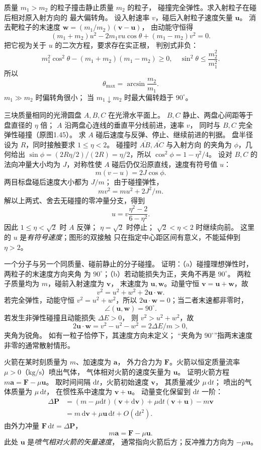 质量 $m_1>m_2$ 的粒子撞击静止质量 $m_2$ 的粒子，
碰撞完全弹性。求入射粒子在碰后相对原入射方向的
最大偏转角。
\exsolution
设入射速率 $v$，碰后入射粒子速度矢量 $\bm u$。
消去靶粒子的末速度
$\bm w=(m_1/m_2)(\bm v-\bm u)$，
由动能守恒得
\[
(m_1+m_2)u^2-2m_1vu\cos\theta+(m_1-m_2)v^2=0.
\]
把它视为关于 $u$ 的二次方程，要求存在实正根，
判别式非负：
\[
m_1^2\cos^2\theta-(m_1+m_2)(m_1-m_2)\ge0,
\quad \sin^2\theta\le\frac{m_2^2}{m_1^2}.
\]
所以
\[
\boxed{\theta_{\max}=\arcsin\frac{m_2}{m_1}}.
\]
\excheck $m_1\gg m_2$ 时偏转角很小；
当 $m_1\downarrow m_2$ 时最大偏转趋于 $90^\circ$。

三块质量相同的光滑圆盘 $A,B,C$ 在光滑水平面上。
$B,C$ 静止、两盘心间距等于盘直径的 $\eta$ 倍；
$A$ 沿两盘心连线的垂直平分线前进，速率 $v$，
同时与 $B,C$ 完全弹性碰撞（原图1.45）。
求 $A$ 碰后速度与反弹、停止、继续前进的判据。
\exsolution
盘半径设为 $R$，同时接触要求 $1\le\eta<2$。
碰撞时 $\overline{AB},\overline{AC}$ 与入射方向
的夹角为 $\phi$，几何给出
$\sin\phi=(2R\eta/2)/(2R)=\eta/2$，所以
$\cos^2\phi=1-\eta^2/4$。
设对 $B,C$ 的法向冲量大小均为 $J$，对称性使
$A$ 碰后仍仅沿原直线，速度有符号值 $u$：
\[
m(v-u)=2J\cos\phi.
\]
两目标盘碰后速度大小都为 $J/m$；
由于碰撞弹性，
\[
mv^2=mu^2+2J^2/m.
\]
解以上两式、舍去无碰撞的零冲量分支，得到
\[
\boxed{u=v\frac{\eta^2-2}{6-\eta^2}}.
\]
因此 $1\le\eta<\sqrt2$ 时 $A$ 反弹；
$\eta=\sqrt2$ 时停止；
$\sqrt2<\eta<2$ 时继续向前。
\excheck 这里的 $u$ 是\emph{有符号速度}；图形的双接触
只在指定中心距区间有意义，不能延伸到 $\eta>2$。

一个分子与另一个同质量、碰前静止的分子碰撞。
证明：（a）碰撞理想弹性时，两粒子的末速度方向夹角
为 $90^\circ$；（b）若动能损失为正，夹角不再是 $90^\circ$。
\exsolution
两粒子质量均为 $m$，碰前入射速度为 $\bm v$，
末速度为 $\bm u,\bm w$。动量守恒
$\bm v=\bm u+\bm w$，故
\[
v^2=u^2+w^2+2\bm u\cdot\bm w.
\]
若完全弹性，动能守恒
$v^2=u^2+w^2$，所以
$2\bm u\cdot\bm w=0$；当二者末速都非零时，
\[
\boxed{\angle(\bm u,\bm w)=90^\circ}.
\]
若发生非弹性碰撞且动能损失 $\Delta E>0$，
则 $v^2>u^2+w^2$，故
\[
2\bm u\cdot\bm w
=v^2-u^2-w^2=2\Delta E/m>0,
\]
夹角为锐角。
\excheck 如有一粒子恰停下，其速度方向未定义；
“夹角为 $90^\circ$”指两末速度非零的通常散射情形。

火箭在某时刻质量为 $m$、加速度为 $\bm a$，
外力合力为 $\bm F$。火箭以恒定质量流率
$\mu>0$（$\mathrm{kg/s}$）喷出气体，
气体相对火箭的速度矢量为 $\bm u$。
证明火箭方程 $m\bm a=\bm F-\mu\bm u$。
\exsolution
取时间间隔 $\mathrm dt$，火箭初始速度 $\bm v$，
其质量减少 $\mu\,\mathrm dt$；
喷出的气体质量为 $\mu\,\mathrm dt$，
在惯性系中速度为 $\bm v+\bm u$。
动量变化保留到 $\mathrm dt$ 一阶：
\[
\begin{aligned}
\Delta\bm P
&=(m-\mu\mathrm dt)(\bm v+\mathrm d\bm v)
 +\mu\mathrm dt(\bm v+\bm u)-m\bm v\\
&=m\,\mathrm d\bm v+\mu\bm u\,\mathrm dt
+O(\mathrm dt^2).
\end{aligned}
\]
由外力冲量 $\bm F\,\mathrm dt=\Delta\bm P$，
\[
\boxed{m\bm a=\bm F-\mu\bm u}.
\]
\excheck 此处 $\bm u$ 是\emph{喷气相对火箭的矢量速度}，
通常指向火箭后方；反冲推力方向为 $-\mu\bm u$。


